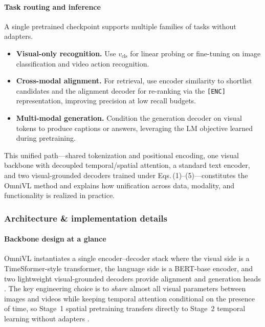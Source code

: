 \begin{enrichment}
\begin{enrichment}
        \paragraph{Task routing and inference}
        A single pretrained checkpoint supports multiple families of tasks without adapters. 
        \begin{itemize}
            \item \textbf{Visual-only recognition.} Use \(v_{\mathrm{cls}}\) for linear probing or fine-tuning on image classification and video action recognition. 
            \item \textbf{Cross-modal alignment.} For retrieval, use encoder similarity to shortlist candidates and the alignment decoder for re-ranking via the \texttt{[ENC]} representation, improving precision at low recall budgets. 
            \item \textbf{Multi-modal generation.} Condition the generation decoder on visual tokens to produce captions or answers, leveraging the LM objective learned during pretraining. 
        \end{itemize}
        This unified path—shared tokenization and positional encoding, one visual backbone with decoupled temporal/spatial attention, a standard text encoder, and two visual-grounded decoders trained under Eqs.\,(1)–(5)—constitutes the OmniVL method and explains how unification across data, modality, and functionality is realized in practice. 
        
        \subsubsection{Architecture \& implementation details}
        \label{subsubsec:chapter24_omnivl_arch}
        
        \paragraph{Backbone design at a glance}
        OmniVL instantiates a single encoder–decoder stack where the visual side is a TimeSformer-style transformer, the language side is a BERT-base encoder, and two lightweight visual-grounded decoders provide alignment and generation heads \cite{wang2022_omnivl,bertasius2021_timesformer,devlin2019_bert}. The key engineering choice is to \emph{share} almost all visual parameters between images and videos while keeping temporal attention conditional on the presence of time, so Stage~1 spatial pretraining transfers directly to Stage~2 temporal learning without adapters \cite{wang2022_omnivl}.
        

\end{enrichment}
\end{enrichment}
